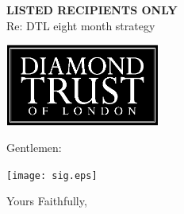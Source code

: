 \documentclass[12pt]{letter}
\begin{document}
\begin{letter}{{\bf LISTED RECIPIENTS ONLY}\\ \vspace{0.25in} Re: DTL eight month strategy}

\vspace*{-1.0in}
\begin{center}
\includegraphics[width=2in]{../logo_withFonts.eps}
\end{center}

\vspace*{-1.25in}

\address{
14 Greville St\\
Suite 77\\
London\\
EC1N 8BQ\\
UK\\
\\
+44 (0)20 7327 3080}

\date{May 2, 2000}

\signature{Jason Rohrer\\Acting President\\Diamond Trust of London}


\opening{Gentlemen:}




\vspace*{0.35in}
\begin{center}
\texttt{[image: sig.eps]}
\end{center}
\vspace*{-1.25in}


\closing{Yours Faithfully,}





\end{letter}
\end{document}
